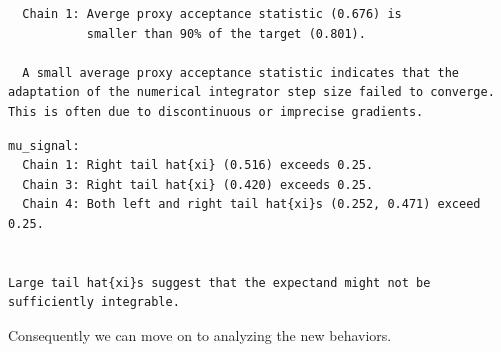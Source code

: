 \documentclass[
  letterpaper,
  DIV=11,
  numbers=noendperiod]{scrartcl}
\newenvironment{Shaded}{\begin{snugshade}}{\end{snugshade}}
\newcommand{\FunctionTok}[1]{\textcolor[rgb]{0.28,0.35,0.67}{#1}}
\newcommand{\NormalTok}[1]{\textcolor[rgb]{0.00,0.23,0.31}{#1}}
\newcommand{\OtherTok}[1]{\textcolor[rgb]{0.00,0.23,0.31}{#1}}
\newcommand{\SpecialCharTok}[1]{\textcolor[rgb]{0.37,0.37,0.37}{#1}}
\newcommand{\StringTok}[1]{\textcolor[rgb]{0.13,0.47,0.30}{#1}}
\begin{document}
\begin{verbatim}
  Chain 1: Averge proxy acceptance statistic (0.676) is
           smaller than 90% of the target (0.801).

  A small average proxy acceptance statistic indicates that the
adaptation of the numerical integrator step size failed to converge.
This is often due to discontinuous or imprecise gradients.
\end{verbatim}

\begin{Shaded}
\end{Shaded}

\begin{verbatim}
mu_signal:
  Chain 1: Right tail hat{xi} (0.516) exceeds 0.25.
  Chain 3: Right tail hat{xi} (0.420) exceeds 0.25.
  Chain 4: Both left and right tail hat{xi}s (0.252, 0.471) exceed 0.25.


Large tail hat{xi}s suggest that the expectand might not be
sufficiently integrable.
\end{verbatim}

Consequently we can move on to analyzing the new behaviors.
\end{document}
